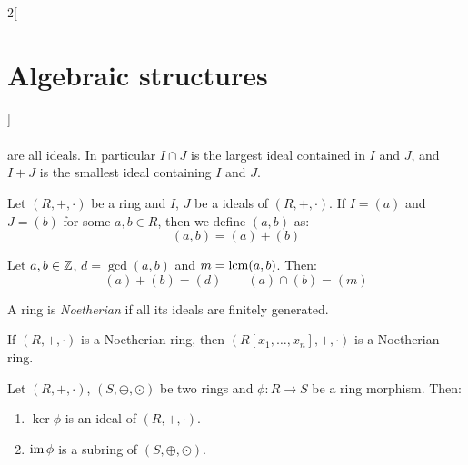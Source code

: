 \documentclass[../../../main.tex]{subfiles}
\begin{document}
\begin{multicols}{2}[\section{Algebraic structures}]
\begin{prop}
\begin{gather*}
    \end{gather*}
    are all ideals. In particular $I\cap J$ is the largest ideal contained in $I$ and $J$, and $I+J$ is the smallest ideal containing $I$ and $J$.
  \end{prop}
  \begin{definition}
    Let $(R,+,\cdot)$ be a ring and $I$, $J$ be a ideals of $(R,+,\cdot)$. If $I=(a)$ and $J=(b)$ for some $a,b\in R$, then we define $(a,b)$ as: $$(a,b)=(a)+(b)$$
  \end{definition}
  \begin{prop}
    Let $a,b\in\mathbb{Z}$, $d=\gcd(a,b)$ and $m=\operatorname{lcm}(a,b)$. Then: $$(a)+(b)=(d)\qquad(a)\cap(b)=(m)$$
  \end{prop}
  \begin{definition}
    A ring is \textit{Noetherian} if all its ideals are finitely generated.
  \end{definition}
  \begin{theorem}
    If $(R,+,\cdot)$ is a Noetherian ring, then $(R[x_1,\ldots,x_n],+,\cdot)$ is a Noetherian ring.
  \end{theorem}
  \begin{lemma}
    Let $(R,+,\cdot)$, $(S,\oplus,\odot)$ be two rings and $\phi:R\rightarrow S$ be a ring morphism. Then:
    \begin{enumerate}
      \item $\ker\phi$ is an ideal of $(R,+,\cdot)$.
      \item $\operatorname{im}\phi$ is a subring of $(S,\oplus,\odot)$.
    \end{enumerate}
  \end{lemma}

\end{multicols}
\end{document}
